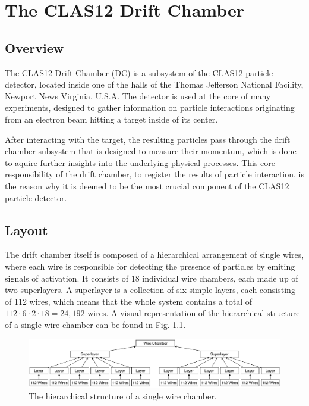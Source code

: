 \chapter{The CLAS12 Drift Chamber}

\section{Overview}

The CLAS12 Drift Chamber (DC) is a subsystem of the CLAS12 particle
detector, located inside one of the halls of the Thomas
Jefferson National Facility, Newport News Virginia, U.S.A. The
detector is used at the core of many experiments, designed to gather
information on particle interactions originating from an
electron beam hitting a target inside of its center.

After interacting with the target, the resulting particles pass
through the drift chamber subsystem that is designed to measure their
momentum, which is done to aquire further insights into the underlying
physical processes. This core responsibility of the drift chamber, to
register the results of particle interaction, is the reason why it is
deemed to be the most crucial component of the CLAS12 particle
detector.

\section{Layout}

The drift chamber itself is composed of a hierarchical arrangement of
single wires, where each wire is responsible for detecting the presence of
particles by emiting signals of activation. It consists of 18
individual wire chambers, each made up of two superlayers. A
superlayer is a collection of six simple layers, each consisting of
112 wires, which means that the whole system contains a total of
\(112 \cdot 6 \cdot 2 \cdot 18 = 24,192\) wires.
A visual representation of the hierarchical structure of a
single wire chamber can be found in Fig. \ref{fig:wire-chamber}.
\begin{figure}[h]
  \centering
  \includegraphics[width=\textwidth]{../figures/wire_chamber}
  \caption{The hierarchical structure of a single wire chamber.}
  \label{fig:wire-chamber}
\end{figure}

